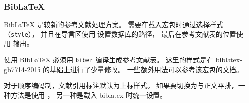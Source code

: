 \documentclass[a4paper]{ltxdoc}
\DeclareRobustCommand\file{\nolinkurl}
\DeclareRobustCommand\pkg{\textsf}
\DeclareRobustCommand\opt{\texttt}
\begin{document}
\subsubsection{BibLaTeX}

BibLaTeX 是较新的参考文献处理方案。
需要在载入宏包时通过选择样式（\opt{style}），
并且在导言区使用  设置数据库的路径，
最后在参考文献表的位置使用  输出。
\begin{latex}
  \usepackage[style=hfutthesis-author-year]{biblatex}
  
\end{latex}
使用 BibLaTeX 必须用 \file{biber} 编译生成参考文献表。
这里的样式是在 \href{https://ctan.org/pkg/biblatex-gb7714-2015}{biblatex-gb7714-2015}
的基础上进行了少量修改。
一些额外用法可以参考该宏包的文档。

对于顺序编码制，文献引用标注默认为上标样式。
如果要切换为与正文平排，一种方法是使用 ，
另一种是载入 \pkg{biblatex} 时统一设置。
\begin{latex}
  \usepackage[bibstyle=hfutthesis-numeric,
  citestyle=hfutthesis-inline]{biblatex}
\end{latex}
\end{document}
